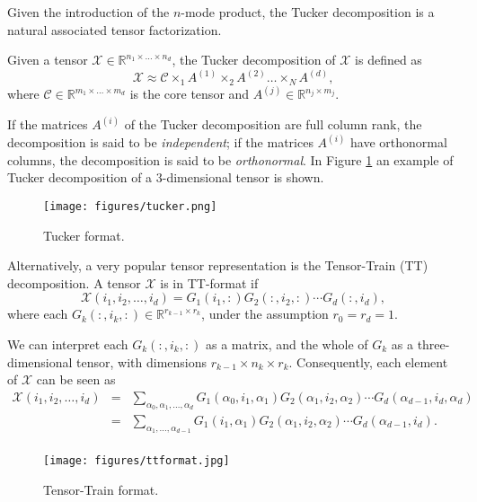 \documentclass{siamart190516}
\newcommand{\cc}[1]{\mathcal{#1}}
\newcommand{\bb}[1]{\mathbb{#1}}
\newcommand{\cX}{\cc X}
\newcommand{\RR}{\mathbb R}
\begin{document}
Given the introduction of the $n$-mode product, the Tucker decomposition is a natural associated tensor
factorization.
\begin{definition}
Given a tensor $\cX\in\RR^{n_1\times \dots\times n_d}$, the Tucker decomposition of $\cX$ is defined as
\[
\cX\approx \cc{C}\times_1 A^{(1)}\times_2 A^{(2)}\dots \times_N A^{(d)},
\]
where $\cc{C}\in\RR^{m_1\times \dots\times m_d}$ is the core tensor and $A^{(j)}\in\RR^{n_j\times m_j}$.
\end{definition}
If the matrices $A^{(i)}$ of the Tucker decomposition are full column rank, the decomposition is said to be \textit{independent}; if the matrices $A^{(i)}$ have orthonormal columns, the decomposition is said to be \textit{orthonormal}. In Figure \ref{fig_tucker} an example of Tucker decomposition of a $3$-dimensional tensor is shown.
 \begin{figure}[htb]\label{fig_tucker}
\centering
    \texttt{[image: figures/tucker.png]}
    \caption{Tucker format.}
\end{figure}   



Alternatively, a very popular tensor representation is the Tensor-Train (TT) decomposition.
A tensor $\cc{X}$ is in TT-format if 
\begin{equation}\label{def_tt}
    \cc{X}(i_1,i_2,\ldots,i_d) = G_1(i_1,:)G_2(:,i_2,:)\cdots G_d(:,i_d),
\end{equation}
where each $G_k(:,i_k,:)\in\bb{R}^{r_{k-1}\times r_k}$, under the assumption $r_0=r_d=1$.

We can interpret each $G_k(:,i_k,:)$ as a matrix, and the whole of $G_k$ as a three-dimensional tensor, with dimensions $r_{k-1}\times n_k \times r_k$. Consequently, each element of $\cc{X}$ can be seen as
\begin{eqnarray}\nonumber
    \cc{X}(i_1, i_2,\ldots, i_d) &=& \sum_{\alpha_0,\alpha_1,\ldots,\alpha_d}G_1(\alpha_0, i_1, \alpha_1)G_2(\alpha_1, i_2, \alpha_2)\cdots G_d(\alpha_{d-1}, i_d, \alpha_d)\\ 
    &=& \sum_{\alpha_1,\ldots,\alpha_{d-1}}G_1( i_1, \alpha_1)G_2(\alpha_1, i_2, \alpha_2)\cdots G_d(\alpha_{d-1}, i_d).\\ \nonumber
\end{eqnarray}

 \begin{figure}[htb]
\centering
    \texttt{[image: figures/ttformat.jpg]}
    \caption{Tensor-Train format.}
\end{figure} 
\end{document}
